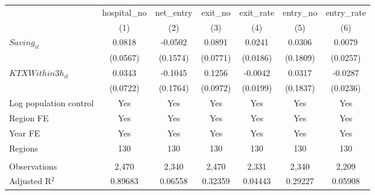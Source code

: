 \begingroup
\centering
\begin{tabular}{lcccccc}
   \toprule
                          & hospital\_no  & net\_entry  & exit\_no  & exit\_rate  & entry\_no  & entry\_rate \\    
                          & (1)           & (2)         & (3)       & (4)         & (5)        & (6)\\  
   \midrule 
   $Saving_{it}$          & 0.0818        & -0.0502     & 0.0891    & 0.0241      & 0.0306     & 0.0079\\   
                          & (0.0567)      & (0.1574)    & (0.0771)  & (0.0186)    & (0.1809)   & (0.0257)\\   
   $KTXWithin3h_{it}$     & 0.0343        & -0.1045     & 0.1256    & -0.0042     & 0.0317     & -0.0287\\   
                          & (0.0722)      & (0.1764)    & (0.0972)  & (0.0199)    & (0.1837)   & (0.0236)\\   
   Log population control & Yes           & Yes         & Yes       & Yes         & Yes        & Yes\\  
   Region FE              & Yes           & Yes         & Yes       & Yes         & Yes        & Yes\\  
   Year FE                & Yes           & Yes         & Yes       & Yes         & Yes        & Yes\\  
   Regions                & 130           & 130         & 130       & 130         & 130        & 130\\  
    \\
   Observations           & 2,470         & 2,340       & 2,470     & 2,331       & 2,340      & 2,209\\  
   Adjusted R$^2$         & 0.89683       & 0.06558     & 0.32359   & 0.04443     & 0.29227    & 0.05908\\  
   \bottomrule
\end{tabular}
\par\endgroup
